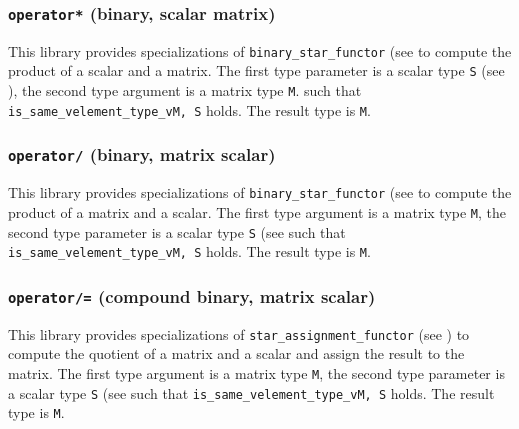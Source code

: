 \documentclass[oneside]{book}
\begin{document}
\subsubsection{\texttt{operator*} (binary, scalar matrix)}
This library provides specializations of
\texttt{binary\_star\_functor}
(see \cite{arithmeticfunctors} to compute the
product of a scalar and a matrix.
The first type parameter is a scalar type \texttt{S} (see \cite{mathscalars}), the second type argument is a matrix type \texttt{M}.
such that \texttt{is\_same\_v\textlangle element\_type\_v\textlangle M\textrangle, S\textrangle} holds.
The result type is \texttt{M}.

\subsubsection{\texttt{operator/} (binary, matrix scalar)}
This library provides specializations of
\texttt{binary\_star\_functor}
(see \cite{arithmeticfunctors} to compute the
product of a matrix and a scalar.
The first type argument is a matrix type \texttt{M}, the second type parameter is a scalar type \texttt{S} (see \cite{mathscalars}
such that \texttt{is\_same\_v\textlangle element\_type\_v\textlangle M\textrangle, S\textrangle} holds.
The result type is \texttt{M}.

\subsubsection{\texttt{operator/=} (compound binary, matrix scalar)}
This library provides specializations of
\texttt{star\_assignment\_functor}
(see \cite{arithmeticfunctors}) to compute the
quotient of a matrix and a scalar and assign the result to the matrix.
The first type argument is a matrix type \texttt{M}, the second type parameter is a scalar type \texttt{S} (see \cite{mathscalars}
such that \texttt{is\_same\_v\textlangle element\_type\_v\textlangle M\textrangle, S\textrangle} holds.
The result type is \texttt{M}.
\end{document}
